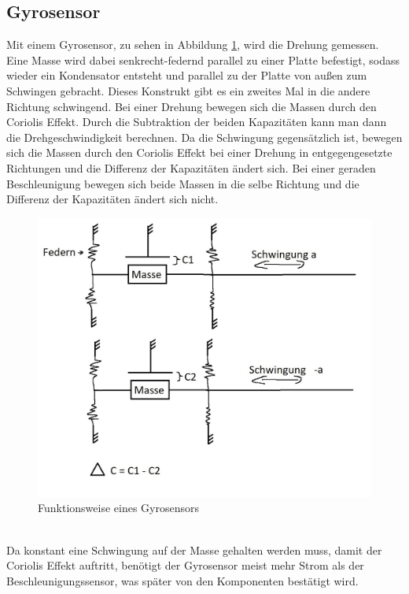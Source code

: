 \subsection{Gyrosensor}
Mit einem Gyrosensor, zu sehen in Abbildung \ref{fig:pic_gyro}, wird die Drehung gemessen.
Eine Masse wird dabei senkrecht-federnd parallel zu einer Platte befestigt, sodass wieder ein Kondensator entsteht und parallel zu der Platte von außen zum Schwingen gebracht.
Dieses Konstrukt gibt es ein zweites Mal in die andere Richtung schwingend.
Bei einer Drehung bewegen sich die Massen durch den Coriolis Effekt.
Durch die Subtraktion der beiden Kapazitäten kann man dann die Drehgeschwindigkeit berechnen.
Da die Schwingung gegensätzlich ist, bewegen sich die Massen durch den Coriolis Effekt bei einer Drehung in entgegengesetzte Richtungen und die Differenz der Kapazitäten ändert sich.
Bei einer geraden Beschleunigung bewegen sich beide Massen in die selbe Richtung und die Differenz der Kapazitäten ändert sich nicht. \cite{gyrosensor}
\begin{figure}[hbtp]
	\centering
	\includegraphics[width=0.65\linewidth]{res/gyro.jpg}
	\caption{Funktionsweise eines Gyrosensors}
	\label{fig:pic_gyro}
\end{figure}\\
Da konstant eine Schwingung auf der Masse gehalten werden muss, damit der Coriolis Effekt auftritt, benötigt der Gyrosensor meist mehr Strom als der Beschleunigungssensor, was später von den Komponenten bestätigt wird.

